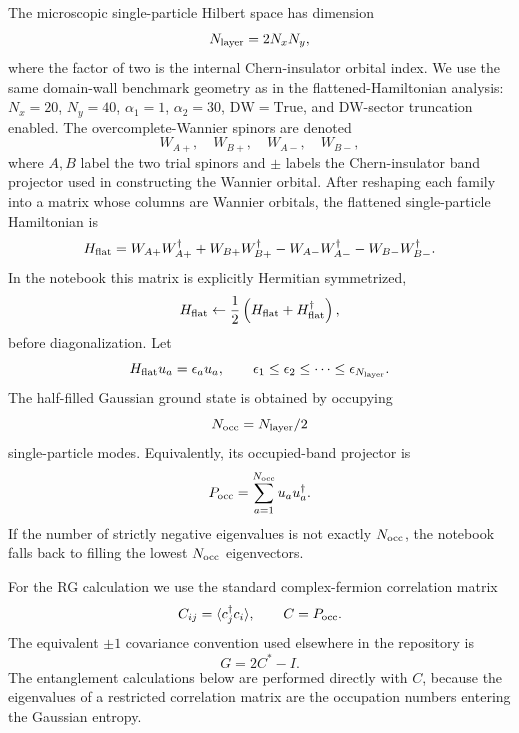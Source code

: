 \documentclass[aps,prb,twocolumn,floatfix]{revtex4-2}
\newcommand{\Hflat}{H_{\rm flat}}
\newcommand{\Pocc}{P_{\rm occ}}
\begin{document}
The microscopic single-particle Hilbert space has dimension
\begin{equation}
  N_{\rm layer}=2N_xN_y,
\end{equation}
where the factor of two is the internal Chern-insulator orbital index.  We use
the same domain-wall benchmark geometry as in the flattened-Hamiltonian
analysis: \(N_x=20\), \(N_y=40\), \(\alpha_1=1\), \(\alpha_2=30\),
\(\mathrm{DW}=\mathrm{True}\), and DW-sector truncation enabled.  The
overcomplete-Wannier spinors are denoted
\begin{equation}
  W_{A+},\quad W_{B+},\quad W_{A-},\quad W_{B-},
\end{equation}
where \(A,B\) label the two trial spinors and \(\pm\) labels the Chern-insulator
band projector used in constructing the Wannier orbital.  After reshaping each
family into a matrix whose columns are Wannier orbitals, the flattened
single-particle Hamiltonian is
\begin{equation}
  \Hflat =
  W_{A+}W_{A+}^{\dagger}
  +W_{B+}W_{B+}^{\dagger}
  -W_{A-}W_{A-}^{\dagger}
  -W_{B-}W_{B-}^{\dagger}.
  \label{eq:hflat}
\end{equation}
In the notebook this matrix is explicitly Hermitian symmetrized,
\begin{equation}
  \Hflat \leftarrow \frac{1}{2}\left(\Hflat+\Hflat^\dagger\right),
\end{equation}
before diagonalization.  Let
\begin{equation}
  \Hflat u_a = \epsilon_a u_a,\qquad
  \epsilon_1\leq\epsilon_2\leq\cdots\leq\epsilon_{N_{\rm layer}}.
\end{equation}
The half-filled Gaussian ground state is obtained by occupying
\begin{equation}
  N_{\rm occ}=N_{\rm layer}/2
\end{equation}
single-particle modes.  Equivalently, its occupied-band projector is
\begin{equation}
  \Pocc = \sum_{a=1}^{N_{\rm occ}} u_a u_a^\dagger.
  \label{eq:pocc}
\end{equation}
If the number of strictly negative eigenvalues is not exactly \(N_{\rm occ}\),
the notebook falls back to filling the lowest \(N_{\rm occ}\) eigenvectors.

For the RG calculation we use the standard complex-fermion correlation matrix
\begin{equation}
  C_{ij}=\langle c_j^\dagger c_i\rangle,
  \qquad C=\Pocc.
  \label{eq:cdef}
\end{equation}
The equivalent \(\pm 1\) covariance convention used elsewhere in the repository is
\begin{equation}
  G = 2C^* - I.
\end{equation}
The entanglement calculations below are performed directly with \(C\), because
the eigenvalues of a restricted correlation matrix are the occupation numbers
entering the Gaussian entropy.
\end{document}
